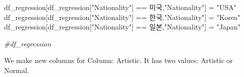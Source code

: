 \documentclass[
]{article}
\newenvironment{Shaded}{\begin{snugshade}}{\end{snugshade}}
\newcommand{\CommentTok}[1]{\textcolor[rgb]{0.56,0.35,0.01}{\textit{#1}}}
\newcommand{\NormalTok}[1]{#1}
\newcommand{\OtherTok}[1]{\textcolor[rgb]{0.56,0.35,0.01}{#1}}
\newcommand{\SpecialCharTok}[1]{\textcolor[rgb]{0.00,0.00,0.00}{#1}}
\newcommand{\StringTok}[1]{\textcolor[rgb]{0.31,0.60,0.02}{#1}}
\begin{document}
\begin{Shaded}
\begin{Highlighting}[]
\NormalTok{df\_regression[df\_regression[}\StringTok{"Nationality"}\NormalTok{] }\SpecialCharTok{==} \StringTok{\textquotesingle{}미국\textquotesingle{}}\NormalTok{,}\StringTok{"Nationality"}\NormalTok{] }\OtherTok{=} \StringTok{"USA"}
\NormalTok{df\_regression[df\_regression[}\StringTok{"Nationality"}\NormalTok{] }\SpecialCharTok{==} \StringTok{\textquotesingle{}한국\textquotesingle{}}\NormalTok{,}\StringTok{"Nationality"}\NormalTok{] }\OtherTok{=} \StringTok{"Korea"}
\NormalTok{df\_regression[df\_regression[}\StringTok{"Nationality"}\NormalTok{] }\SpecialCharTok{==} \StringTok{\textquotesingle{}일본\textquotesingle{}}\NormalTok{,}\StringTok{"Nationality"}\NormalTok{] }\OtherTok{=} \StringTok{"Japan"}
\end{Highlighting}
\end{Shaded}

\begin{Shaded}
\end{Shaded}

\begin{Shaded}
\begin{Highlighting}[]
\CommentTok{\#df\_regression}
\end{Highlighting}
\end{Shaded}

We make new columns for Column: Artistic. It has two values: Artistic or
Normal.

\begin{Shaded}
\end{Shaded}
\end{document}
